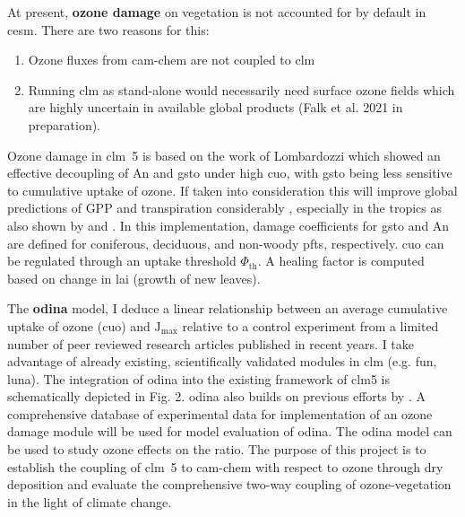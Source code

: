 At present, \textbf{\color{red}ozone damage} on vegetation is not accounted for by default in \gls{cesm}. There are two reasons for this: 
\begin{enumerate}
  \itemsep0em
\item Ozone fluxes from \gls{cam}-chem are not coupled to \gls{clm} 
\item Running \gls{clm} as stand-alone would necessarily need surface ozone fields which are highly uncertain in available global products (Falk et al. 2021 in preparation).
\end{enumerate}
Ozone damage in \gls{clm}~5 is based on the work of Lombardozzi \parencite{Oe:Lombardozzi2012} which showed an effective decoupling of An and gsto under high \gls{cuo}, with gsto being less sensitive to cumulative uptake of ozone. If taken into consideration this will improve global predictions of GPP and transpiration considerably \parencite{BGS:Lombardozzi2012}, especially in the tropics as also shown by \textcite{ACP:Pacifico2015} and \textcite{ACP:Pacifico2015}. In this implementation, damage coefficients for gsto and An are defined for coniferous, deciduous, and non-woody \glspl{pft}, respectively. \gls{cuo} can be regulated through an uptake threshold $\Phi_\mathrm{th}$. A healing factor is computed based on change in \gls{lai} (growth of new leaves).

The \textbf{\gls{odina}} model, I deduce a linear relationship between an average cumulative uptake of ozone (\gls{cuo}) and $\mathrm{J_{max}}$ relative to a control experiment from a limited number of peer reviewed research articles published in recent years. I take advantage of already existing, scientifically validated modules in \gls{clm} (e.g. \gls{fun}, \gls{luna}). The integration of \gls{odina} into the existing framework of \gls{clm}5 is schematically depicted in Fig. 2. \gls{odina} also builds on previous efforts by \textcites{BGS:Lombardozzi2012}{Oe:Lombardozzi2012}. A comprehensive database of experimental data for implementation of an ozone damage module \parencite{BGS:Lombardozzi2013} will be used for model evaluation of \gls{odina}. The \gls{odina} model can be used to study ozone effects on the  ratio. The purpose of this project is to establish the coupling of \gls{clm}~5 to \gls{cam}-chem with respect to ozone through dry deposition and evaluate the comprehensive two-way coupling of ozone-vegetation in the light of climate change.
